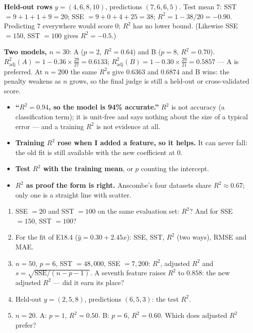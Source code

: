 \documentclass[11pt]{article}
\begin{document}
\begin{worked}
\textbf{Held-out rows} $y = (4, 6, 8, 10)$, predictions $(7, 6, 6, 5)$. Test
mean $7$: SST $= 9 + 1 + 1 + 9 = 20$; SSE $= 9 + 0 + 4 + 25 = 38$;
$R^2 = 1 - 38/20 = \mathbf{-0.90}$. Predicting $7$ everywhere would score $0$;
$R^2$ has no lower bound. (Likewise SSE $= 150$, SST $= 100$ gives
$R^2 = -0.5$.)

\textbf{Two models, $n = 30$}: A ($p = 2$, $R^2 = 0.64$) and B ($p = 8$,
$R^2 = 0.70$).
$R^2_{\text{adj}}(A) = 1 - 0.36 \times \tfrac{29}{27} = 0.6133$;
$R^2_{\text{adj}}(B) = 1 - 0.30 \times \tfrac{29}{21} = 0.5857$ --- A is
preferred. At $n = 200$ the same $R^2$s give $0.6363$ and $0.6874$ and B wins:
the penalty weakens as $n$ grows, so the final judge is still a held-out or
cross-validated score.
\end{worked}

\begin{caution}
\begin{itemize}
  \item \textbf{``$R^2 = 0.94$, so the model is 94\% accurate.''} $R^2$ is
    not accuracy (a classification term); it is unit-free and says nothing
    about the size of a typical error --- and a training $R^2$ is not evidence
    at all.
  \item \textbf{Training $R^2$ rose when I added a feature, so it helps.} It
    can never fall: the old fit is still available with the new coefficient at
    $0$.
  \item \textbf{Test $R^2$ with the training mean}, or $p$ counting the
    intercept.
  \item \textbf{$R^2$ as proof the form is right.} Anscombe's four datasets
    share $R^2 \approx 0.67$; only one is a straight line with scatter.
\end{itemize}
\end{caution}

\begin{tryit}
\begin{enumerate}[label=\textbf{E20.\arabic*}]
  \item SSE $= 20$ and SST $= 100$ on the same evaluation set: $R^2$? And for
    SSE $= 150$, SST $= 100$?
  \item For the fit of E18.4 ($\hat y = 0.30 + 2.45x$): SSE, SST, $R^2$ (two
    ways), RMSE and MAE.
  \item $n = 50$, $p = 6$, SST $= 48{,}000$, SSE $= 7{,}200$: $R^2$, adjusted
    $R^2$ and $s = \sqrt{\mathrm{SSE}/(n - p - 1)}$. A seventh feature raises
    $R^2$ to $0.858$: the new adjusted $R^2$ --- did it earn its place?
  \item Held-out $y = (2, 5, 8)$, predictions $(6, 5, 3)$: the test $R^2$.
  \item $n = 20$. A: $p = 1$, $R^2 = 0.50$. B: $p = 6$, $R^2 = 0.60$. Which
    does adjusted $R^2$ prefer?
\end{enumerate}
\end{tryit}
\end{document}
